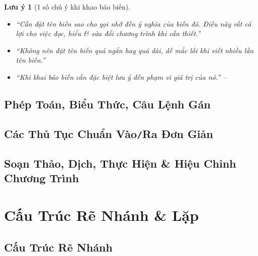 \documentclass[oneside]{book}
\numberwithin{equation}{section}
\newtheorem{luuy}{Lưu ý}[section]
\begin{document}
\begin{luuy}[1 số chú ý khi khao báo biến]
	\begin{itemize}
		\item ``Cần đặt tên biến sao cho gọi nhớ đến ý nghĩa của biến đó. Điều này rất có lợi cho việc đọc, hiểu \& sửa đổi chương trình khi cần thiết.''
		\item ``Không nên đặt tên biến quá ngắn hay quá dài, dễ mắc lỗi khi viết nhiều lần tên biến.''
		\item ``Khi khai báo biến cần đặc biệt lưu ý đến phạm vi giá trị của nó.'' -- \cite[p. 23]{SGK_Tin_Hoc_11}
	\end{itemize}
\end{luuy}


\section{Phép Toán, Biểu Thức, Câu Lệnh Gán}


\section{Các Thủ Tục Chuẩn Vào\texttt{/}Ra Đơn Giản}


\section{Soạn Thảo, Dịch, Thực Hiện \& Hiệu Chỉnh Chương Trình}


\chapter{Cấu Trúc Rẽ Nhánh \& Lặp}

\section{Cấu Trúc Rẽ Nhánh}

\end{document}
